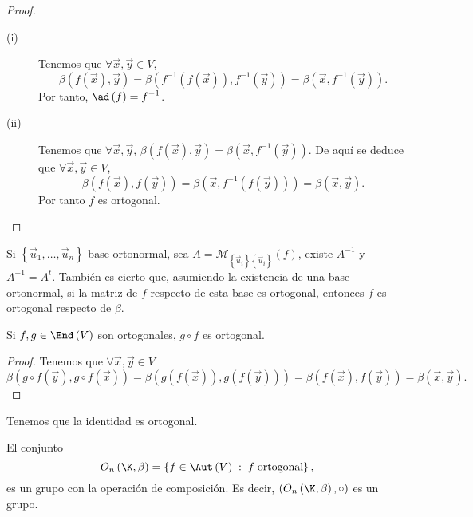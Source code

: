 \begin{proof}
\begin{description}
\item[(i)] Tenemos que $\displaystyle \forall \vec{x}, \vec{y} \in V $,
	\[ \beta\left(f\left(\vec{x}\right), \vec{y}\right) = \beta\left(f^{-1}\left(f\left(\vec{x}\right)\right), f^{-1}\left(\vec{y}\right)\right)=\beta\left(\vec{x}, f^{-1}\left(\vec{y}\right)\right).\]
Por tanto, $\displaystyle \ad\left(f\right) = f^{-1} $.
\item[(ii)] Tenemos que $\displaystyle \forall \vec{x}, \vec{y} $, $\displaystyle \beta\left(f\left(\vec{x}\right), \vec{y}\right) = \beta\left(\vec{x}, f^{-1}\left(\vec{y}\right)\right) $. De aquí se deduce que $\displaystyle \forall \vec{x}, \vec{y} \in V $,
	\[\beta\left(f\left(\vec{x}\right), f\left(\vec{y}\right)\right) = \beta\left(\vec{x}, f^{-1}\left(f\left(\vec{y}\right)\right)\right) = \beta\left(\vec{x}, \vec{y}\right).\]
	Por tanto $\displaystyle f $ es ortogonal.
\end{description}
\end{proof}
\begin{observation}
\normalfont 	Si $\displaystyle \left\{ \vec{u}_{1}, \ldots, \vec{u}_{n}\right\}  $ base ortonormal, sea $\displaystyle A = \mathcal{M}_{ \left\{ \vec{u}_{i}\right\} \left\{ \vec{u}_{i}\right\} }\left(f\right) $, existe $\displaystyle A^{-1} $ y $\displaystyle A^{-1} = A^{t} $. También es cierto que, asumiendo la existencia de una base ortonormal, si la matriz de $\displaystyle f $ respecto de esta base es ortogonal, entonces $\displaystyle f $ es ortogonal respecto de $\displaystyle \beta  $.
\end{observation}
\begin{fprop}[]
\normalfont Si $\displaystyle f,g \in \End\left(V\right) $ son ortogonales, $\displaystyle g\circ f $ es ortogonal.
\end{fprop}
\begin{proof}
Tenemos que $\displaystyle \forall \vec{x}, \vec{y} \in V $ 
\[  \beta\left(g\circ f\left(\vec{y}\right), g\circ f\left(\vec{x}\right)\right) = \beta\left(g\left(f\left(\vec{x}\right)\right), g\left(f\left(\vec{y}\right)\right)\right) = \beta\left(f\left(\vec{x}\right), f\left(\vec{y}\right)\right) = \beta\left(\vec{x}, \vec{y}\right).\]
\end{proof}
\begin{eg}
\normalfont Tenemos que la identidad es ortogonal.
\end{eg}
\begin{observation}
\normalfont El conjunto
\[O_{n}\left(\K,\beta \right)= \left\{ f \in \Aut\left(V\right) \; : \; f \; \text{ortogonal}\right\}  ,\]
es un grupo con la operación de composición. Es decir, $\displaystyle \left(O_{n}\left(\K, \beta \right), \circ \right) $ es un grupo.
\end{observation}
